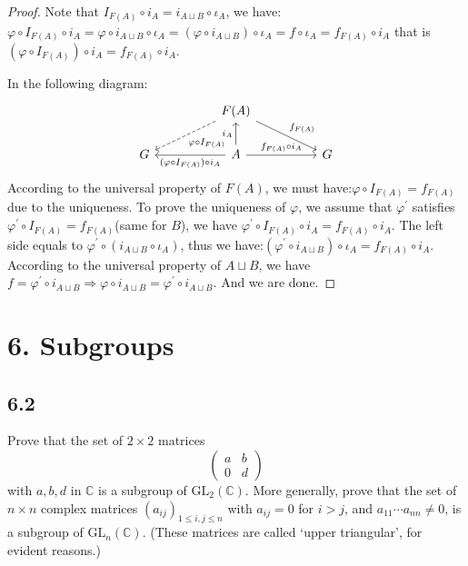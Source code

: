 \documentclass[a4paper, pdf, 12pt]{article}
\begin{document}
\begin{proof}
  Note that $I_{F(A)}\circ i_{A} = i_{A\sqcup B}\circ \iota_{A}$, we have:$\varphi \circ I_{F(A)}\circ i_{A} = \varphi \circ i_{A\sqcup B} \circ \iota_{A} = (\varphi\circ i_{A\sqcup B})\circ \iota_{A} 
    = f\circ \iota_{A} = f_{F(A)} \circ i_{A}
  $ that is $(\varphi \circ I_{F(A)})\circ i_{A} = f_{F(A)}\circ i_{A}$.

  In the following diagram:
  $$
  \begin{tikzcd}[column sep=huge]
     & \ar[ld, dashed, "\varphi \circ I_{F(A)}"]F(A) \ar[rd, "f_{F(A)}"]& \\
  G  &  \ar[l, "(\varphi \circ I_{F(A)})\circ i_{A}"]A \ar[u, "i_{A}"] \ar[r, "f_{F(A)}\circ i_{A}"] & G
  \end{tikzcd}
  $$
  According to the universal property of $F(A)$, we must have:$\varphi \circ I_{F(A)} = f_{F(A)}$ due to the uniqueness.
  To prove the uniqueness of $\varphi$, we assume that $\varphi^{'}$ satisfies $\varphi^{'}\circ I_{F(A)} = f_{F(A)}$(same for $B$), we have
  $\varphi^{'}\circ I_{F(A)}\circ i_{A} = f_{F(A)}\circ i_{A}$. The left side equals to 
  $\varphi^{'}\circ(i_{A\sqcup B}\circ \iota_{A})$, thus we have:$(\varphi^{'}\circ i_{A\sqcup B})\circ \iota_{A} = f_{F(A)}\circ i_{A}$. According to the universal property of $A\sqcup B$, we have $f = \varphi^{'}\circ i_{A\sqcup B} \Rightarrow \varphi \circ i_{A\sqcup B} = \varphi^{'}\circ i_{A\sqcup B}$.
  And we are done.

\end{proof}

  \section*{6. Subgroups}
  \subsection*{6.2}
  Prove that the set of $2 \times 2$ matrices 
  $$
  \begin{pmatrix}
    a & b\\
    0 & d
  \end{pmatrix}
  $$ with $a,b,d$ in $\mathbb{C}$ is a subgroup of $\mbox{GL}_{2}(\mathbb{C})$. 
  More generally, prove that the set of $n\times n$ complex matrices $(a_{ij})_{1\leq i,j\leq n}$ with $a_{ij} = 0$ for $i > j$, and $a_{11}\cdots a_{nn} \neq 0$,
  is a subgroup of $\mbox{GL}_n(\mathbb{C})$. (These matrices are called `upper triangular', for evident
  reasons.)
\end{document}
